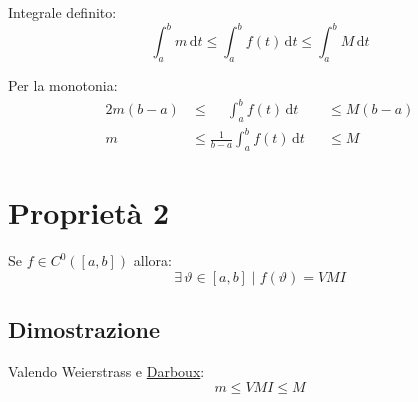 \documentclass[../../dimostrazioni]{subfiles}
\begin{document}
            Integrale definito:
            \[\int_{a}^{b} \! m \, \mathrm{d} t \leqslant \int_{a}^{b} \! f(t) \, \mathrm{d} t \leqslant \int_{a}^{b} \! M \, \mathrm{d} t\]

            Per la monotonia:
            \begin{alignat*}{2}
                m(b-a) &\leqslant \quad \: \int_{a}^{b} \! f(t) \, \mathrm{d} t &&\leqslant M(b-a) \\
                m &\leqslant \frac{1}{b-a} \int_{a}^{b} \! f(t) \, \mathrm{d} t &&\leqslant M
            \end{alignat*}

    \section*{Proprietà 2}

        Se \(f \in C^0 ([a,b]) \) allora:
        \[\exists \, \vartheta\in [a, b] \mid f(\vartheta) = VMI \]

        \subsection*{Dimostrazione}
    
            Valendo Weierstrass e \hyperref[teoDarboux]{Darboux}:
            \[m \leqslant VMI \leqslant M \]
\end{document}
